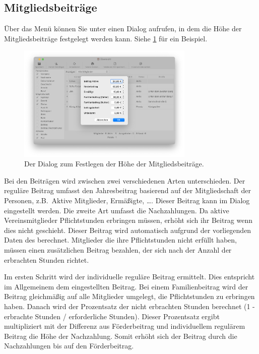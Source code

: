 \begin{neu}
\section{Mitgliedsbeiträge}\label{personal:mitglieder:beitrag}
Über das Menü  können Sie unter  einen Dialog aufrufen,
in dem die Höhe der Mitgliedsbeiträge festgelegt werden kann.
Siehe \cref{fig:personal:mitglieder:beitrag} für ein Beispiel.

\begin{figure}[!h]
  \centering
	\includegraphics[width=0.75\textwidth]{img/personal-beitrag}
	\caption{Der Dialog zum Festlegen der Höhe der Mitgliedsbeiträge.}
	\label{fig:personal:mitglieder:beitrag}
\end{figure}

Bei den Beiträgen wird zwischen zwei verschiedenen Arten unterschieden.
Der reguläre Beitrag umfasst den Jahresbeitrag basierend auf der Mitgliedschaft der Personen, z.B.\ Aktive Mitglieder, Ermäßigte, \dots.
Dieser Beitrag kann im Dialog eingestellt werden.
Die zweite Art umfasst die Nachzahlungen.
Da aktive Vereinsmitglieder Pflichtstunden erbringen müssen,
erhöht sich ihr Beitrag wenn dies nicht geschieht.
Dieser Beitrag wird automatisch aufgrund der vorliegenden Daten des \Einsatz berechnet.
Mitglieder die ihre Pflichtstunden nicht erfüllt haben, müssen einen zusätzlichen Beitrag bezahlen, der sich nach der Anzahl der erbrachten Stunden richtet.

Im ersten Schritt wird der individuelle reguläre Beitrag ermittelt.
Dies entspricht im Allgemeinem dem eingestellten Beitrag.
Bei einem Familienbeitrag wird der Beitrag gleichmäßig auf alle Mitglieder umgelegt,
die Pflichtstunden zu erbringen haben.
Danach wird der Prozentsatz der nicht erbrachten Stunden berechnet
(1 - erbrachte Stunden / erforderliche Stunden).
Dieser Prozentsatz ergibt multipliziert mit der Differenz aus Förderbeitrag und individuellem regulärem Beitrag die Höhe der Nachzahlung.
Somit erhöht sich der Beitrag durch die Nachzahlungen bis auf den Förderbeitrag.



\end{neu}
